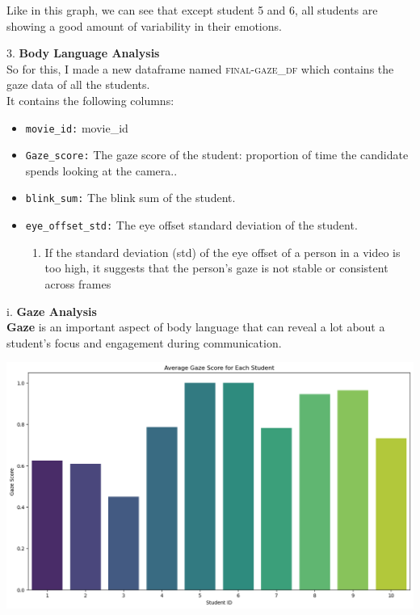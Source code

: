 \documentclass{article}
\begin{document}
\caption{Like in this graph, we can see that except student 5 and 6, all students are showing a good amount of variability in their emotions.}

\vspace*{0.4in}
3. \textbf{Body Language Analysis}\\
So for this, I made a new dataframe named \textsc{final-gaze\_df} which contains the gaze data of all the students.\\ 

It contains the following columns:
\begin{itemize}
    \item \texttt{movie\_id:} movie\_id
    \item \texttt{Gaze\_score:} The gaze score of the student: proportion of time the candidate spends looking at the camera..
    \item \texttt{blink\_sum:} The blink sum of the student.
    \item \texttt{eye\_offset\_std:} The eye offset standard deviation of the student.\\
    {
        \begin{enumerate}
            \item If the standard deviation (std) of the eye offset of a person in a video is too high, it suggests that the person's gaze is not stable or consistent across frames
        \end{enumerate}
    }
\end{itemize}
\vspace{0.3in}
i. \textbf{Gaze Analysis}\\
\textbf{Gaze} is an important aspect of body language that can reveal a lot about a student's focus and engagement during communication.\\

\begin{center}
    \includegraphics[width=1\columnwidth]{images/gaze_mean.png}
\end{center}
\end{document}
